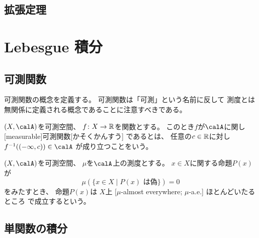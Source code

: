 \documentclass[report]{jlreq}
\begin{document}
\section{拡張定理}






%
\chapter{Lebesgue 積分}

%
\section{可測関数}

可測関数の概念を定義する。
可測関数は「可測」という名前に反して
測度とは無関係に定義される概念であることに注意すべきである。

\begin{definition}[可測関数]
    $(X, \calA)$を可測空間、
    $f \colon X \to \mathbb{R}$を関数とする。
    このとき$f$が$\calA$に関し
    [measurable]{可測関数}[かそくかんすう]
    であるとは、
    任意の$c \in \mathbb{R}$に対し
    $f^{-1}((-\infty, c)) \in \calA$
    が成り立つことをいう。
\end{definition}

\begin{definition}[ほとんどいたるところ]
    $(X, \calA)$を可測空間、
    $\mu$を$\calA$上の測度とする。
    $x \in X$に関する命題$P(x)$が
    \begin{equation}
        \mu(\{ x \in X \mid P(x) \text{ は偽} \}) = 0
    \end{equation}
    をみたすとき、
    命題$P(x)$は
    $X$上
    [$\mu$-almost everywhere; $\mu$-a.e.]
        {ほとんどいたるところ}
    で成立するという。
\end{definition}

%
\section{単関数の積分}
\end{document}
